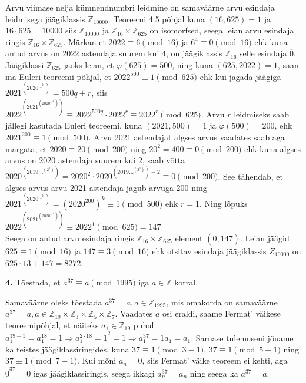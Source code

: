 \documentclass[a4paper, 10pt]{article}
\newcommand{\Z}{\mathbb{Z}}
\newcommand{\w}{\overline}
\begin{document}
\bigskip
Arvu viimase nelja kümnendnumbri leidmine on samaväärne arvu esindaja leidmisega jäägiklassis $\Z_{10000}$. Teoreemi 4.5 põhjal kuna $(16,625)=1$ ja $16\cdot625=10000$ siis $\Z_{10000}$ ja $\Z_{16}\times \Z_{625}$ on isomorfsed, seega leian arvu esindaja ringis $\Z_{16}\times \Z_{625}$. Märkan et $2022\equiv6\pmod{16}$ ja $6^4\equiv0\pmod{16}$ ehk kuna antud arvus on 2022 astendaja suurem kui 4, on jäägiklassis $\Z_{16}$ selle esindaja $\w0$.\\
Jäägiklassi $\Z_{625}$ jaoks leian, et $\varphi(625)=500$, ning kuna $(625,2022)=1$, saan ma Euleri teoreemi põhjal, et $2022^{500}\equiv1\pmod{625}$ ehk kui jagada jäägiga $2021^{(2020^{\ldots^{2^1}})}= 500q+r$, siis $2022^{(2021^{(2020^{\ldots^{2^1}})})}\equiv2022^{500q}\cdot2022^r\equiv2022^r\pmod{625}$. Arvu $r$ leidmiseks saab jällegi kasutada Euleri teoreemi, kuna $(2021,500)=1$ ja $\varphi(500)=200$, ehk $2021^{200}\equiv1\pmod{500}$. Arvu 2021 astendajat algses arvus vaadates saab aga märgata, et $2020\equiv20\pmod {200}$ ning $20^2=400\equiv0\pmod{200}$ ehk kuna algses arvus on 2020 astendaja suurem kui 2, saab võtta $2020^{(2019\dots^{(2^1)})}=2020^2\cdot2020^{(2019\dots^{(2^1)})-2}\equiv0\pmod{200}$. See tähendab, et algses arvus arvu 2021 astendaja jagub arvuga 200 ning $2021^{(2020^{\ldots^{2^1}})}=(2020^{200})^k\equiv1\pmod{500}$ ehk $r=1$. Ning lõpuks $2022^{(2021^{(2020^{\ldots^{2^1}})})}\equiv2022^1\pmod {625}=147$.\\
Seega on antud arvu esindaja ringis $\Z_{16}\times\Z_{625}$ element $(\w0,\w{147})$. Leian jäägid $625\equiv1\pmod{16}$ ja $147\equiv3\pmod{16}$ ehk otsitav esindaja jäägiklassis $Z_{10000}$ on $625\cdot13+147=8272$.
\bigskip

\pagebreak

\noindent \textbf{4.} Tõestada, et \mbox{$a^{37}\equiv a\pmod{1995}$} iga $a\in\Z$ korral.  

\bigskip
Samaväärne oleks tõestada $a^{37}=a, a\in\Z_{1995}$, mis omakorda on samaväärne $a^{37}=a, a\in\Z_{19}\times\Z_3\times\Z_5\times\Z_7$. Vaadates $a$ osi eraldi, saame Fermat' väikese teoreemipõhjal, et näiteks $a_1\in\Z_{19}$ puhul $a_1^{19-1}=a_1^{18}=\overline{1}\Rightarrow a_1^{2\cdot18}=\overline{1}^2=\overline{1}\Rightarrow a_1^{37}=\overline{1}a_1=a_1$. Sarnase tulemuseni jõuame ka teistes jäägi\-klassi\-ringides, kuna $37\equiv 1 \pmod{3-1}$, $37\equiv 1 \pmod{5-1}$ ning $37\equiv 1 \pmod{7-1}$. Kui mõni $a_n=0$, siis Fermat' väike teoreem ei kehti, aga $\overline{0}^{37}=\overline{0}$ igas jäägiklassiringis, seega ikkagi $a_n^{37}=a_n$ ning seega ka $a^{37}=a$.
\bigskip
\end{document}
